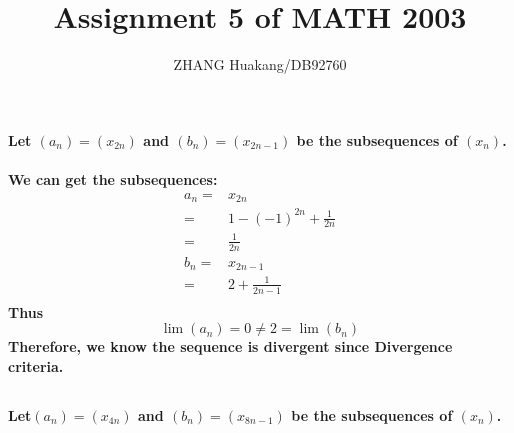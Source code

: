 \documentclass{article}
\title{Assignment 5 of MATH 2003}
\author{ZHANG Huakang/DB92760}
\begin{document}
    \maketitle
    \section{}
        \subsection{}
        \paragraph{
            Let $(a_n)=(x_{2n})$ and $(b_n)=(x_{2n-1})$ be the subsequences of $(x_n)$.
        }
        \paragraph{
            We can get the subsequences:
            \begin{equation*}
                \begin{split}
                    a_n=&x_{2n}\\
                        =&1-(-1)^{2n}+\frac{1}{2n}\\
                        =&\frac{1}{2n}\\
                    b_n=&x_{2n-1}\\
                        =&2+\frac{1}{2n-1}\\
                \end{split}
            \end{equation*}
            Thus
            $$\lim (a_n)=0\neq2=\lim (b_n)$$
            Therefore, we know the sequence is divergent since Divergence criteria.
        }
        \subsection{}
        \paragraph{
            Let$(a_n)=(x_{4n})$ and $(b_n)=(x_{8n-1})$ be the subsequences of $(x_n)$.
        }
\end{document}
